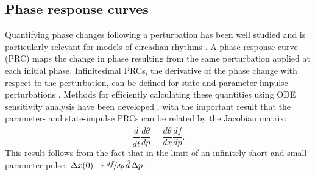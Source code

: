 \subsection{Phase response curves}
Quantifying phase changes following a perturbation has been well studied and is particularly relevant for models of circadian rhythms \cite{Kramer1984, Taylor2008a}.
A phase response curve (PRC) maps the change in phase resulting from the same perturbation applied at each initial phase.
Infinitesimal PRCs, the derivative of the phase change with respect to the perturbation, can be defined for state and parameter-impulse perturbations \cite{Taylor2008a}.
Methods for efficiently calculating these quantities using ODE sensitivity analysis have been developed \cite{Taylor2008a}, with the important result that the parameter- and state-impulse PRCs can be related by the Jacobian matrix:
\begin{equation}
  \frac{d}{d\tilde{t}}\frac{d\theta}{dp} = \frac{d\theta}{dx}\frac{d\tilde{f}}{dp}.
  \label{eq:pPRCequiv}
\end{equation}
This result follows from the fact that in the limit of an infinitely short and small parameter pulse, $\Delta x(0) \to \nicefrac{d\tilde{f}}{dp}\,\tilde{d}\, \Delta p$.

